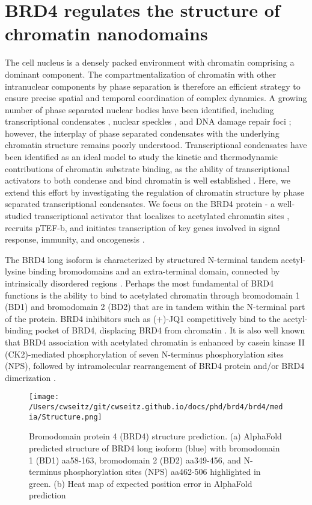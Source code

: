 \section{BRD4 regulates the structure of chromatin nanodomains}

The cell nucleus is a densely packed environment with chromatin comprising a dominant component. The compartmentalization of chromatin with other intranuclear components by phase separation is therefore an efficient strategy to ensure precise spatial and temporal coordination of complex dynamics. A growing number of phase separated nuclear bodies have been identified, including transcriptional condensates \parencite{Sabari2018,Hnisz2017}, nuclear speckles \parencite{Brown2008}, and DNA damage repair foci \parencite{Wang2023}; however, the interplay of phase separated condensates with the underlying chromatin structure remains poorly understood. Transcriptional condensates have been identified as an ideal model to study the kinetic and thermodynamic contributions of chromatin substrate binding, as the ability of transcriptional activators to both condense and bind chromatin is well established \parencite{Sabari2018,Wagh2021,Plys2018,Strom2024,Ma2021}. Here, we extend this effort by investigating the regulation of chromatin structure by phase separated transcriptional condensates. We focus on the BRD4 protein - a well-studied transcriptional activator that localizes to acetylated chromatin sites \parencite{Wu2018}, recruits pTEF-b, and initiates transcription of key genes involved in signal response, immunity, and oncogenesis \parencite{Itzen2014}.

The BRD4 long isoform is characterized by structured N-terminal tandem acetyl-lysine binding bromodomains and an extra-terminal domain, connected by intrinsically disordered regions \parencite{Han2020}. Perhaps the most fundamental of BRD4 functions is the ability to bind to acetylated chromatin through bromodomain 1 (BD1) and bromodomain 2 (BD2) that are in tandem within the N-terminal part of the protein. BRD4 inhibitors such as (+)-JQ1 competitively bind to the acetyl-binding pocket of BRD4, displacing BRD4 from chromatin \parencite{Filippakopoulos2010}. It is also well known that BRD4 association with acetylated chromatin is enhanced by casein kinase II (CK2)-mediated phosphorylation of seven N-terminus phosphorylation sites (NPS), followed by intramolecular rearrangement of BRD4 protein and/or BRD4 dimerization \parencite{Wu2013,Malvezzi2021}.

\begin{figure}[t]
\centering
\texttt{[image: /Users/cwseitz/git/cwseitz.github.io/docs/phd/brd4/brd4/media/Structure.png]}
\caption{Bromodomain protein 4 (BRD4) structure prediction. (a) AlphaFold predicted structure of BRD4 long isoform (blue) with bromodomain 1 (BD1) aa58-163, bromodomain 2 (BD2) aa349-456, and N-terminus phosphorylation sites (NPS) aa462-506 highlighted in green. (b) Heat map of expected position error in AlphaFold prediction}
\end{figure}

